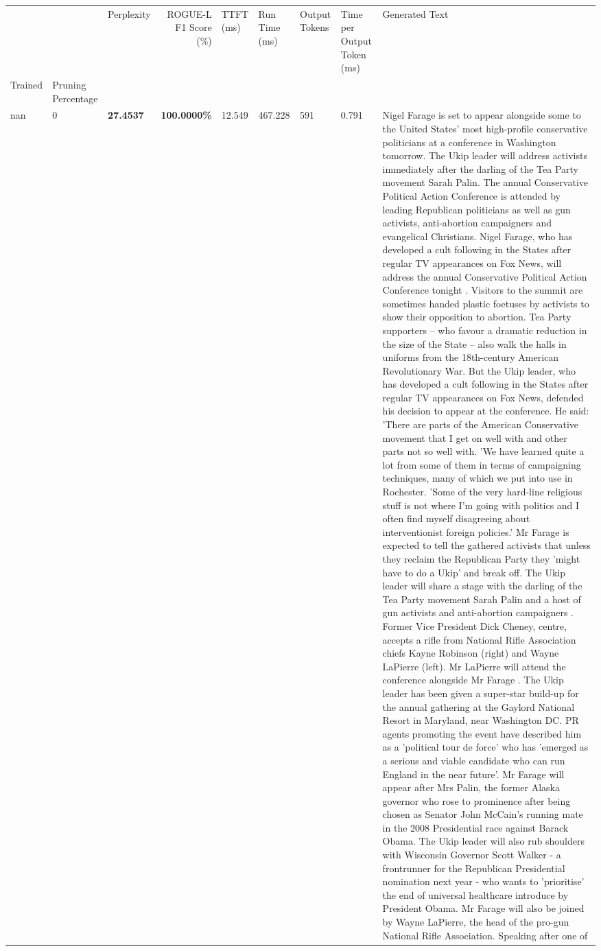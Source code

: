 \begin{table}[H]
\label{tab:evaluation-pipeline-4}
\begin{tabular}{lllrlllll}
\toprule
 &  & Perplexity & ROGUE-L F1 Score (\%) & TTFT (ms) & Run Time (ms) & Output Tokens & Time per Output Token (ms) & Generated Text \\
Trained & Pruning Percentage &  &  &  &  &  &  &  \\
\midrule
nan & 0 & \bfseries 27.4537 & \bfseries 100.0000\% & 12.549 & 467.228 & 591 & 0.791 & Nigel Farage is set to appear alongside some to the United States' most high-profile conservative politicians at a conference in Washington tomorrow. The Ukip leader will address activists immediately after the darling of the Tea Party movement Sarah Palin. The annual Conservative Political Action Conference is attended by leading Republican politicians as well as gun activists, anti-abortion campaigners and evangelical Christians. Nigel Farage, who has developed a cult following in the States after regular TV appearances on Fox News, will address the annual Conservative Political Action Conference tonight . Visitors to the summit are sometimes handed plastic foetuses by activists to show their opposition to abortion. Tea Party supporters – who favour a dramatic reduction in the size of the State – also walk the halls in uniforms from the 18th-century American Revolutionary War. But the Ukip leader, who has developed a cult following in the States after regular TV appearances on Fox News, defended his decision to appear at the conference. He said: 'There are parts of the American Conservative movement that I get on well with and other parts not so well with. 'We have learned quite a lot from some of them in terms of campaigning techniques, many of which we put into use in Rochester. 'Some of the very hard-line religious stuff is not where I'm going with politics and I often find myself disagreeing about interventionist foreign policies.' Mr Farage is expected to tell the gathered activists that unless they reclaim the Republican Party they 'might have to do a Ukip' and break off. The Ukip leader will share a stage with the darling of the Tea Party movement Sarah Palin and a host of gun activists and anti-abortion campaigners . Former Vice President Dick Cheney, centre, accepts a rifle from National Rifle Association chiefs Kayne Robinson (right) and Wayne LaPierre (left). Mr LaPierre will attend the conference alongside Mr Farage . The Ukip leader has been given a super-star build-up for the annual gathering at the Gaylord National Resort in Maryland, near Washington DC. PR agents promoting the event have described him as a 'political tour de force' who has 'emerged as a serious and viable candidate who can run England in the near future'. Mr Farage will appear after Mrs Palin, the former Alaska governor who rose to prominence after being chosen as Senator John McCain's running mate in the 2008 Presidential race against Barack Obama. The Ukip leader will also rub shoulders with Wisconsin Governor Scott Walker - a frontrunner for the Republican Presidential nomination next year - who wants to 'prioritise' the end of universal healthcare introduce by President Obama. Mr Farage will also be joined by Wayne LaPierre, the head of the pro-gun National Rifle Association. Speaking after one of 
\end{tabular}
\end{table}
